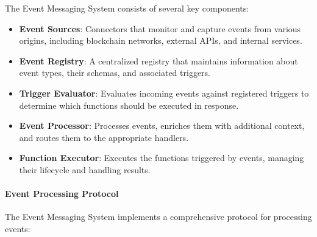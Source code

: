 \documentclass{article}
\begin{document}
The Event Messaging System consists of several key components:

\begin{itemize}
    \item \textbf{Event Sources}: Connectors that monitor and capture events from various origins, including blockchain networks, external APIs, and internal services.
    
    \item \textbf{Event Registry}: A centralized registry that maintains information about event types, their schemas, and associated triggers.
    
    \item \textbf{Trigger Evaluator}: Evaluates incoming events against registered triggers to determine which functions should be executed in response.
    
    \item \textbf{Event Processor}: Processes events, enriches them with additional context, and routes them to the appropriate handlers.
    
    \item \textbf{Function Executor}: Executes the functions triggered by events, managing their lifecycle and handling results.
\end{itemize}

\paragraph{Event Processing Protocol}
The Event Messaging System implements a comprehensive protocol for processing events:
\end{document}
